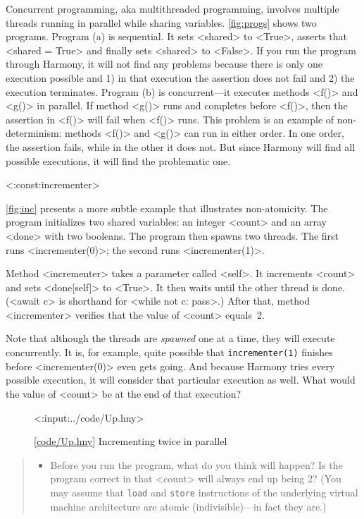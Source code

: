 \documentclass{report}
\newcommand{\harmonylink}[1]{%
[\href{https://harmony.cs.cornell.edu/#1}{\underline{#1}}]%
}
\newenvironment{code}{
\tcolorbox
}{
\endtcolorbox
}
\begin{document}
Concurrent programming, aka multithreaded programming, involves multiple
threads
%
running in parallel while sharing variables.
\autoref{fig:progs} shows two programs.  Program (a) is sequential.
It sets <{shared}> to <{True}>, asserts that
<{shared = True}> and finally sets <{shared}> to <{False}>.
If you run the program through Harmony, it will not find any problems
because there is only one execution possible and 1) in that execution
the assertion does not fail and 2) the execution terminates.
Program (b) is concurrent---it executes methods <{f()}> and
<{g()}> in parallel.
If method <{g()}> runs and completes before <{f()}>, then
the assertion in <{f()}> will fail when <{f()}> runs.
This problem is an example of non-determinism: methods <{f()}>
and <{g()}> can run in either order.
In one order, the assertion fails, while in the other it does not.
But since Harmony will find all possible executions, it will find
the problematic one.

<{:const:incrementer}>

\autoref{fig:inc} presents a more subtle example that illustrates
non-atomicity.
The program initializes two shared variables:
an integer <{count}> and
an array <{done}> with two booleans.
The program then spawns two threads.
The first runs <{incrementer(0)}>; the second runs <{incrementer(1)}>.

Method <{incrementer}> takes a parameter called <{self}>.
It increments <{count}> and sets <{done[self]}> to <{True}>.
It then waits until the other thread is done.
(<{await c}> is shorthand for <{while not c: pass}>.)
After that, method <{incrementer}>
verifies that the value of <{count}> equals~2.

Note that although the threads are \emph{spawned} one at a time,
they will execute concurrently.  It is, for example, quite possible
that \texttt{incrementer(1)} finishes before <{incrementer(0)}>
even gets going.
And because Harmony tries every possible execution, it will consider
that particular execution as well.
What would the value of <{count}> be at the end of that execution?

\begin{figure}[h]
\begin{code}
<{:input:../code/Up.hny}>
\end{code}
\caption{\harmonylink{code/Up.hny} Incrementing twice in parallel}
\label{fig:inc}
\end{figure}

\begin{quote}
\begin{itemize}
\item Before you run the program, what do you think will happen?  Is the
program correct in that <{count}> will always end up being 2?
(You may assume that \texttt{load} and \texttt{store} instructions of the
underlying virtual machine architecture are atomic (indivisible)---in fact
they are.)
\end{itemize}
\end{quote}
\end{document}
